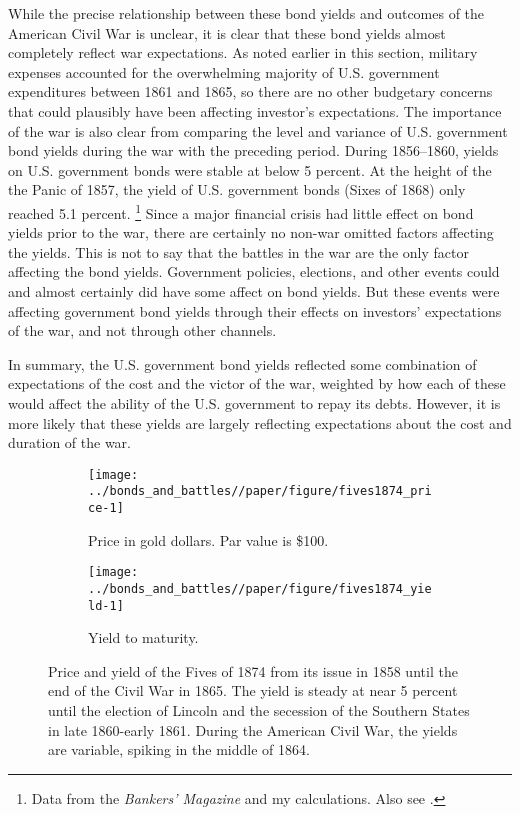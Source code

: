 
While the precise relationship between these bond yields and outcomes of the American Civil War is unclear, it is clear that these bond yields almost completely reflect war expectations.
As noted earlier in this section, military expenses accounted for the overwhelming majority of U.S. government expenditures between 1861 and 1865, so there are no other budgetary concerns that could plausibly have been affecting investor's expectations.
The importance of the war is also clear from comparing the level and variance of U.S. government bond yields during the war with the preceding period.
During 1856--1860, yields on U.S. government bonds were stable at below 5 percent.
At the height of the the Panic of 1857, the yield of U.S. government bonds (Sixes of 1868) only reached 5.1 percent.%
\footnote{Data from the \textit{Bankers' Magazine} and my calculations. Also see \textcite{HomerSylla2005}.}
Since a major financial crisis had little effect on bond yields prior to the war, there are certainly no non-war omitted factors affecting the yields.
This is not to say that the battles in the war are the only factor affecting the bond yields.
Government policies, elections, and other events could and almost certainly did have some affect on bond yields.
But these events were affecting government bond yields through their effects on investors' expectations of the war, and not through other channels.

In summary, the U.S. government bond yields reflected some combination of expectations of the cost and the victor of the war, weighted by how each of these would affect the ability of the U.S. government to repay its debts.
However, it is more likely that these yields are largely reflecting expectations about the cost and duration of the war.

\begin{figure}[!htpb]
  \centering
  \begin{subfigure}[t]{\linewidth}
   \texttt{[image: ../bonds\_and\_battles//paper/figure/fives1874\_price-1]}
  \caption{Price in gold dollars. Par value is \$100.}
  \label{bonds:fig:fives1874_price}
\end{subfigure}
\begin{subfigure}[t]{\linewidth}
   \texttt{[image: ../bonds\_and\_battles//paper/figure/fives1874\_yield-1]}
  \caption{Yield to maturity.}
  \label{bonds:fig:fives1874_yield}
\end{subfigure}
\caption[Price and yield of the Fives of 1874 from its issue in 1858 until the end of the Civil War in 1865]{Price and yield of the Fives of 1874 from its issue in 1858 until the end of the Civil War in 1865.
The yield is steady at near 5 percent until the election of Lincoln and the secession of the Southern States in late 1860-early 1861.
During the American Civil War, the yields are variable, spiking in the middle of 1864.
 }
\label{bonds:fig:fives1874_yield_price}
\end{figure}

